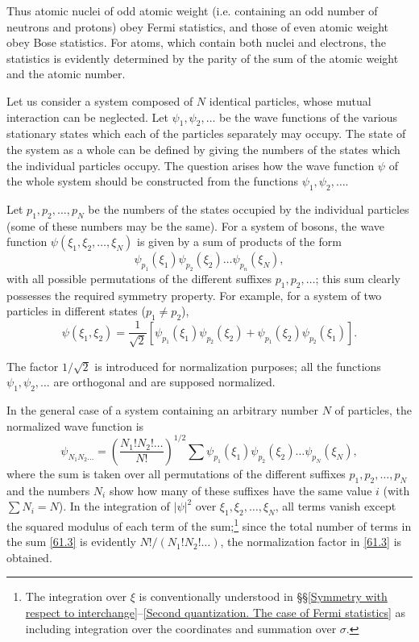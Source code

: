 Thus atomic nuclei of odd atomic weight (i.e. containing an odd number of neutrons and protons) obey Fermi statistics, and those of even atomic weight obey Bose statistics. For atoms, which contain both nuclei and electrons, the statistics is evidently determined by the parity of the sum of the atomic weight and the atomic number.

Let us consider a system composed of $ N $ identical particles, whose mutual interaction can be neglected. Let $ \psi_1, \psi_2, \dots $ be the wave functions of the various stationary states which each of the particles separately may occupy. The state of the system as a whole can be defined by giving the numbers of the states which the individual particles occupy. The question arises how the wave function $\psi$ of the whole system should be constructed from the functions $ \psi_1, \psi_2, \dots $.

Let $ p_1, p_2, \dots, p_N $ be the numbers of the states occupied by the individual particles (some of these numbers may be the same). For a system of bosons, the wave function $ \psi(\xi_1, \xi_2, \dots, \xi_N) $ is given by a sum of products of the form
\begin{equation}\label{61.1}
\psi_{p_1}(\xi_1)\psi_{p_2}(\xi_2)\dots\psi_{p_n}(\xi_N),
\end{equation}
with all possible permutations of the different suffixes $ p_1, p_2, \dots $; this sum clearly possesses the required symmetry property. For example, for a system of two particles in different states ($ p_1 \ne p_2 $),
\begin{equation}\label{61.2}
\psi(\xi_1,\xi_2)=\frac{1}{\sqrt{2}}\left[\psi_{p_1}(\xi_1)\psi_{p_2}(\xi_2)+\psi_{p_1}(\xi_2)\psi_{p_2}(\xi_1) \right].
\end{equation}



The factor $ 1/\sqrt{2} $ is introduced for normalization purposes; all the functions $ \psi_1, \psi_2, \dots $ are orthogonal and are supposed normalized.

In the general case of a system containing an arbitrary number $ N $ of particles, the normalized wave function is
\begin{equation}\label{61.3}
\psi_{N_1N_2\dots}=\left(\frac{N_1!N_2!\dots}{N!} \right)^{1/2}\sum\psi_{p_1}(\xi_1)\psi_{p_2}(\xi_2)\dots\psi_{p_N}(\xi_N),
\end{equation}
where the sum is taken over all permutations of the different suffixes $ p_1, p_2, \dots, p_N $ and the numbers $ N_i $ show how many of these suffixes have the same value $ i $ (with $ \sum N_i = N $). In the integration of $ |\psi|^2 $ over $ \xi_1, \xi_2, \dots, \xi_N $, all terms vanish except the squared modulus of each term of the sum;\footnote{The integration over $ \xi $ is conventionally understood in \S\S\ref{Symmetry with respect to interchange}–\ref{Second quantization. The case of Fermi statistics} as including integration over the coordinates and summation over $\sigma$.
} since the total number of terms in the sum \eqref{61.3} is evidently $ N!/(N_1!N_2!\dots) $, the normalization factor in \eqref{61.3} is obtained.

